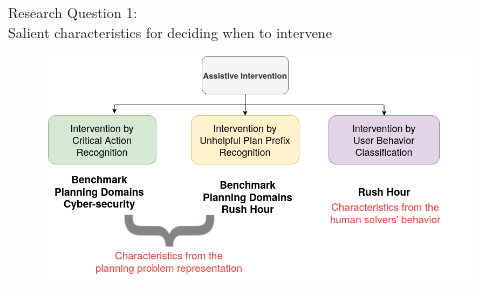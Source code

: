 \begin{frame}{Research Question 1: \\Salient characteristics for deciding when to intervene}
	\begin{figure}[!htb]
  \centering
  \includegraphics[width=\columnwidth, keepaspectratio=true]{img/breakdown.png}
\end{figure}
\end{frame}